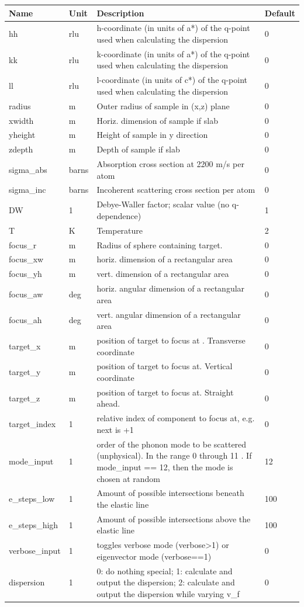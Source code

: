 \begin{longtable}{p{}p{}p{}p{}}
\toprule
\textbf{Name} & \textbf{Unit} & \textbf{Description} & \textbf{Default} \\
\midrule
\endhead
hh & rlu & h-coordinate (in units of a*) of the q-point used when calculating the dispersion & 0 \\
kk & rlu & k-coordinate (in units of a*) of the q-point used when calculating the dispersion & 0 \\
ll & rlu & l-coordinate (in units of c*) of the q-point used when calculating the dispersion & 0 \\
radius & m & Outer radius of sample in (x,z) plane & 0 \\
xwidth & m & Horiz. dimension of sample if slab & 0 \\
yheight & m & Height of sample in y direction & 0 \\
zdepth & m & Depth of sample if slab & 0 \\
sigma\_abs & barns & Absorption cross section at 2200 m/s per atom & 0 \\
sigma\_inc & barns & Incoherent scattering cross section per atom & 0 \\
DW & 1 & Debye-Waller factor; scalar value (no q-dependence) & 1 \\
T & K & Temperature & 2 \\
focus\_r & m & Radius of sphere containing target. & 0 \\
focus\_xw & m & horiz. dimension of a rectangular area & 0 \\
focus\_yh & m & vert.  dimension of a rectangular area & 0 \\
focus\_aw & deg & horiz. angular dimension of a rectangular area & 0 \\
focus\_ah & deg & vert.  angular dimension of a rectangular area & 0 \\
target\_x & m & position of target to focus at . Transverse coordinate & 0 \\
target\_y & m & position of target to focus at. Vertical coordinate & 0 \\
target\_z & m & position of target to focus at. Straight ahead. & 0 \\
target\_index & 1 & relative index of component to focus at, e.g. next is +1 & 0 \\
mode\_input & 1 & order of the phonon mode to be scattered (unphysical). In the range 0 through 11 . If mode\_input == 12, then the mode is chosen at random & 12 \\
e\_steps\_low & 1 & Amount of possible intersections beneath the elastic line & 100 \\
e\_steps\_high & 1 & Amount of possible intersections above the elastic line & 100 \\
verbose\_input & 1 & toggles verbose mode (verbose\textgreater{}1) or eigenvector mode (verbose==1) & 0 \\
dispersion & 1 & 0: do nothing special; 1: calculate and output the dispersion; 2: calculate and output the dispersion while varying v\_f & 0 \\
\bottomrule
\end{longtable}

